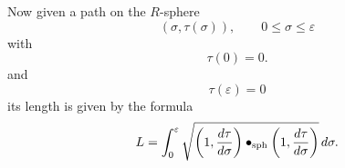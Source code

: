 \documentclass{ximera}
\begin{document}
 Now given a path on the $R$-sphere
 \[
 \left(\sigma,\tau(\sigma)\right),\qquad0\leq\sigma \leq\varepsilon
 \]
 with
 \[
 \tau\left(  0\right)  =0.
 \]
 and%
 \[
 \tau\left(  \varepsilon\right)  =0
 \]
 its length is given by the formula%
\[
L=\int_{0}^{\varepsilon} \sqrt{\left(1,\dd[\tau]{\sigma}\right)\bullet_\mathrm{sph} \left(1,\dd[\tau]{\sigma}\right)}\d\sigma.
\]
\end{document}

